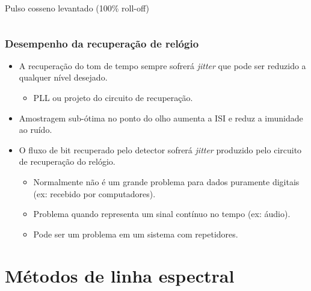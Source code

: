 \begin{frame}
\begin{itemize}
\begin{columns}
\begin{column}{.5\columnwidth}
\begin{figure}
			\end{figure}
		\begin{footnotesize} Pulso cosseno levantado (100\% roll-off) \end{footnotesize}
		\end{column}
		\end{columns}
		
		
	\end{itemize}			
\end{frame}


\begin{frame}
	\frametitle{Desempenho da recuperação de relógio}
	
	\begin{itemize}
		\item A recuperação do tom de tempo sempre sofrerá \textit{jitter} que pode ser reduzido a qualquer nível desejado.
		\begin{itemize}
			\item PLL ou projeto do circuito de recuperação.
		\end{itemize}
		\item Amostragem sub-ótima no ponto do olho aumenta a ISI e reduz a imunidade ao ruído.
		\item O fluxo de bit recuperado pelo detector sofrerá \textit{jitter} produzido pelo circuito de recuperação do relógio.
		\begin{itemize}
			\item Normalmente não é um grande problema para dados puramente digitais (ex: recebido por computadores).
			\item Problema quando representa um sinal contínuo no tempo (ex: áudio).
			\item Pode ser um problema em um sistema com repetidores.
		\end{itemize}
	\end{itemize}			
\end{frame}

\section{Métodos de linha espectral}

